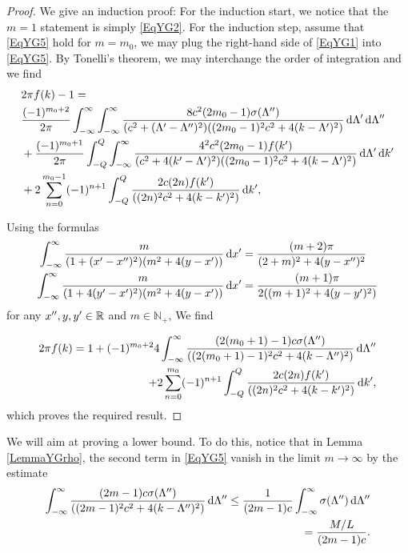 \begin{proof}
	We give an induction proof: For the induction start, we notice that the $ m=1 $ statement is simply \eqref{EqYG2}. For the induction step, assume that \eqref{EqYG5} hold for $ m=m_0 $, we may plug the right-hand side of \eqref{EqYG1} into \eqref{EqYG5}. By Tonelli's theorem, we may interchange the order of integration and we find\begin{equation}
	\begin{aligned}
	&2\pi  f(k)-1=\\
	&\frac{(-1)^{m_0+2}}{2\pi}\int_{-\infty}^{\infty}\int_{-\infty}^{\infty}\frac{8c^2(2m_0-1)\sigma(\Lambda'')}{(c^2+(\Lambda'-\Lambda'')^2)((2m_0-1)^2c^2+4(k-\Lambda')^2)}\mathop{}\!\mathrm{d}\Lambda'\mathop{}\!\mathrm{d}\Lambda''\\
	&+\frac{(-1)^{m_0+1}}{2\pi}\int_{-Q}^{Q}\int_{-\infty}^{\infty}\frac{4^2c^2(2m_0-1) f(k')}{(c^2+4(k'-\Lambda')^2)((2m_0-1)^2c^2+4(k-\Lambda')^2)}\mathop{}\!\mathrm{d}\Lambda'\mathop{}\!\mathrm{d} k'\\
	&+2\sum_{n=0}^{m_0-1}(-1)^{n+1}\int_{-Q}^{Q}\frac{2c(2n) f(k')}{((2n)^2c^2+4(k-k')^2)}\mathop{}\!\mathrm{d} k',
	\end{aligned}
	\end{equation}
	
	Using the formulas
	\begin{align}
	\int_{-\infty}^{\infty}\frac{m}{(1+(x'-x'')^2)(m^2+4(y-x'))}\mathop{}\!\mathrm{d} x'&=\frac{(m+2)\pi}{(2+m)^2+4(y-x'')^2}\\
	\int_{-\infty}^{\infty}\frac{m}{(1+4(y'-x')^2)(m^2+4(y-x'))}\mathop{}\!\mathrm{d} x'&=\frac{(m+1)\pi}{2((m+1)^2+4(y-y')^2)}
	\end{align}
	for any $ x'',y,y'\in\mathbb{R} $ and $ m\in\mathbb{N}_+ $,
	We find 
	
	\begin{equation}
	\begin{aligned}
	2\pi  f(k)=1+(-1)^{m_0+2}4\int_{-\infty}^{\infty}\frac{ (2(m_0+1)-1)c\sigma(\Lambda'')}{((2(m_0+1)-1)^2 c^2+4(k-\Lambda'')^2)}\mathop{}\!\mathrm{d}\Lambda''\\
	+2\sum_{n=0}^{m_0}(-1)^{n+1}\int_{-Q}^{Q}\frac{2c(2n) f(k')}{((2n)^2c^2+4(k-k')^2)}\mathop{}\!\mathrm{d} k',
	\end{aligned}
	\end{equation}
	which proves the required result.
\end{proof}
We will aim at proving a lower bound. To do this, notice that in Lemma \ref{LemmaYGrho}, the second term in \eqref{EqYG5} vanish in the limit $ m\to\infty $ by the estimate \begin{equation}\label{EqYGLemma1bound}
	\begin{aligned}
	\int_{-\infty}^{\infty}\frac{ (2m-1)c\sigma(\Lambda'')}{((2m-1)^2 c^2+4(k-\Lambda'')^2)}\mathop{}\!\mathrm{d}\Lambda''\leq \frac{1}{(2m-1)c}\int_{-\infty}^{\infty}\sigma(\Lambda'')\mathop{}\!\mathrm{d} \Lambda''\\=\frac{M/L}{(2m-1)c}.
	\end{aligned}
	\end{equation}
